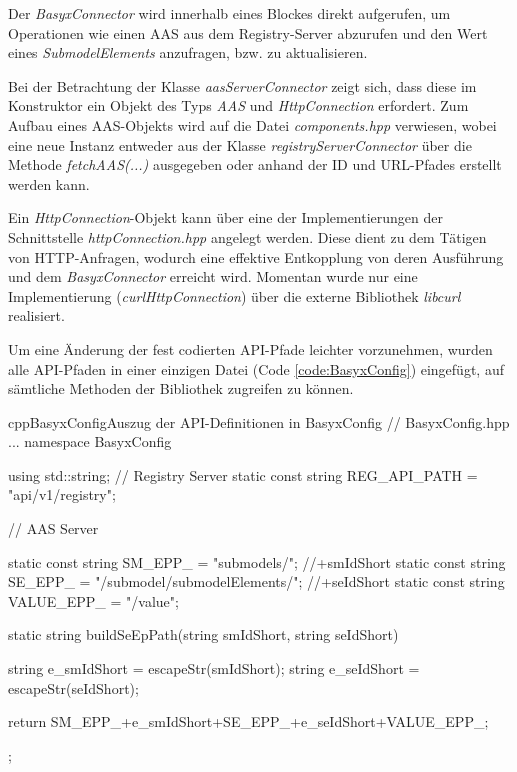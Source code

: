 Der \textit{BasyxConnector} wird innerhalb eines Blockes direkt aufgerufen, um Operationen wie einen AAS aus dem Registry-Server abzurufen und den Wert eines \textit{SubmodelElements} anzufragen, bzw. zu aktualisieren.

Bei der Betrachtung der Klasse \textit{aasServerConnector} zeigt sich, dass diese im Konstruktor ein Objekt des Typs \textit{AAS} und \textit{HttpConnection} erfordert. Zum Aufbau eines AAS-Objekts wird auf die Datei \textit{components.hpp} verwiesen, wobei eine neue Instanz entweder aus der Klasse \textit{registryServerConnector} über die Methode \textit{fetchAAS(...)} ausgegeben oder anhand der ID und URL-Pfades erstellt werden kann. 

Ein \textit{HttpConnection}-Objekt kann über eine der Implementierungen der Schnittstelle \textit{httpConnection.hpp} angelegt werden. Diese dient zu dem Tätigen von HTTP-Anfragen, wodurch eine effektive Entkopplung von deren  Ausführung und dem \textit{BasyxConnector} erreicht wird. Momentan wurde nur eine Implementierung (\textit{curlHttpConnection}) über die externe Bibliothek \textit{libcurl} realisiert.

Um eine Änderung der fest codierten API-Pfade leichter vorzunehmen, wurden alle API-Pfaden in einer einzigen Datei (Code \ref{code:BasyxConfig}) eingefügt, auf sämtliche Methoden der Bibliothek zugreifen zu können.


\begin{codeblock}{cpp}{BasyxConfig}{Auszug der API-Definitionen in BasyxConfig}
// BasyxConfig.hpp
...
namespace BasyxConfig
{
    using std::string;
    // Registry Server
    static const string REG_API_PATH = "api/v1/registry";
    
    // AAS Server

    static const string SM_EPP_ = "submodels/"; //+smIdShort
    static const string SE_EPP_ = "/submodel/submodelElements/"; //+seIdShort
    static const string VALUE_EPP_ = "/value";
    
    static string buildSeEpPath(string smIdShort, string seIdShort) 
    {
        string e_smIdShort = escapeStr(smIdShort);
        string e_seIdShort = escapeStr(seIdShort);

        return SM_EPP_+e_smIdShort+SE_EPP_+e_seIdShort+VALUE_EPP_;
    }
};
\end{codeblock}


